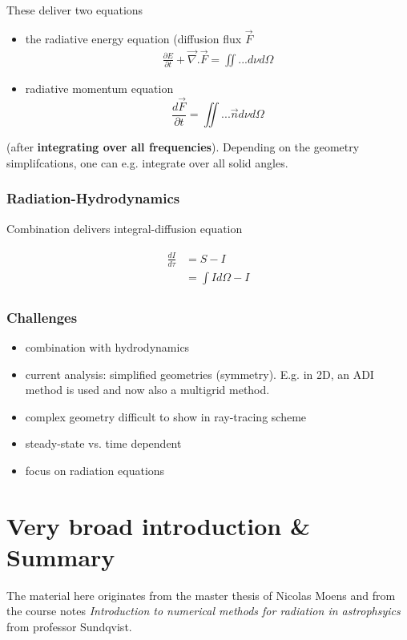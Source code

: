 \documentclass[../main/main.tex]{subfiles}
\begin{document}
These deliver two equations
\begin{itemize}
	\item the radiative energy equation (diffusion flux $\vec{F}$
	\begin{eqnarray}
	\frac{\partial E}{\partial t} + \vec{\nabla} . \vec{F} = \iint ... d\nu d \Omega
	\end{eqnarray}
	\item radiative momentum equation
	\begin{equation}
		\frac{d\vec{F}}{\partial t} = \iint ... \vec{n} d\nu d\Omega
		\end{equation}
\end{itemize}
(after \textbf{integrating over all frequencies}). Depending on the geometry simplifcations, one can e.g. integrate over all solid angles.


\subsubsection{Radiation-Hydrodynamics}
Combination delivers integral-diffusion equation

\begin{eqnarray}
\begin{aligned}
\frac{dI}{d\tau} &=  S - I \\
	&= \int I d\Omega - I
\end{aligned}
\end{eqnarray}

\subsubsection{Challenges}
\begin{itemize}
	\item combination with hydrodynamics
	\item current analysis: simplified geometries (symmetry). E.g. in 2D, an ADI method is used and now also a multigrid method. 
	\item complex geometry difficult to show in ray-tracing scheme
	\item steady-state vs. time dependent
	\item focus on radiation equations
\end{itemize}


\newpage
\section{Very broad introduction \& Summary}
The material here originates from the master thesis of Nicolas Moens \cite{MoensNicolas} and from the course notes \textit{Introduction to numerical methods for radiation in astrophsyics} from professor Sundqvist. 
\end{document}
